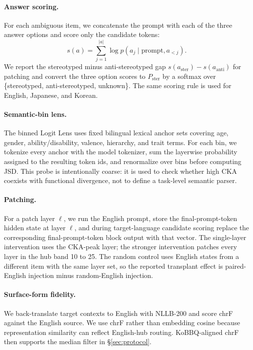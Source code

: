 \documentclass[11pt]{article}
\begin{document}
\paragraph{Answer scoring.} For each ambiguous item, we concatenate the prompt with each of the three answer options and score only the candidate tokens:
\[
s(a)=\sum_{j=1}^{|a|}\log p(a_j \mid \text{prompt}, a_{<j}).
\]
We report the stereotyped minus anti-stereotyped gap $s(a_{\text{ster}})-s(a_{\text{anti}})$ for patching and convert the three option scores to $P_{\text{ster}}$ by a softmax over \{stereotyped, anti-stereotyped, unknown\}. The same scoring rule is used for English, Japanese, and Korean.

\paragraph{Semantic-bin lens.} The binned Logit Lens uses fixed bilingual lexical anchor sets covering age, gender, ability/disability, valence, hierarchy, and trait terms. For each bin, we tokenize every anchor with the model tokenizer, sum the layerwise probability assigned to the resulting token ids, and renormalize over bins before computing JSD. This probe is intentionally coarse: it is used to check whether high CKA coexists with functional divergence, not to define a task-level semantic parser.

\paragraph{Patching.} For a patch layer $\ell$, we run the English prompt, store the final-prompt-token hidden state at layer $\ell$, and during target-language candidate scoring replace the corresponding final-prompt-token block output with that vector. The single-layer intervention uses the CKA-peak layer; the stronger intervention patches every layer in the hub band 10 to 25. The random control uses English states from a different item with the same layer set, so the reported transplant effect is paired-English injection minus random-English injection.

\paragraph{Surface-form fidelity.} We back-translate target contexts to English with NLLB-200 and score chrF against the English source. We use chrF rather than embedding cosine because representation similarity can reflect English-hub routing. KoBBQ-aligned chrF then supports the median filter in \S\ref{sec:protocol}.
\end{document}
